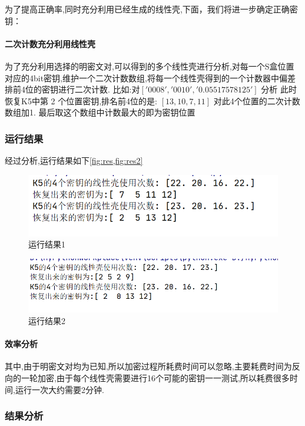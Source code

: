\documentclass[UTF-8]{ctexart}
\begin{document}
为了提高正确率,同时充分利用已经生成的线性壳,下面，我们将进一步确定正确密钥：
 \paragraph{二次计数充分利用线性壳} 为了充分利用选择的明密文对,可以得到的多个线性壳进行分析,对每一个S盒位置对应的4bit密钥,维护一个二次计数数组,将每一个线性壳得到的一个计数器中偏差排前4位的密钥进行二次计数.
	比如:对$['0008','0010','0.05517578125']$ 分析
	此时恢复K5中第 2 个位置密钥,排名前4位的是: $[13,10,7,11]$
	对此4个位置的二次计数数组加1.
	最后取这个数组中计数最大的即为密钥位置
\subsubsection{运行结果}
经过分析,运行结果如下\cref{fig:res,fig:res2}
\begin{figure}[!htbp]
	\centering
	\includegraphics[width=0.8\linewidth]{Res}
	\caption{运行结果1}
	\label{fig:res}
\end{figure}

\begin{figure}[!htbp]
	\centering
	\includegraphics[width=0.8\linewidth]{Res2}
	\caption{运行结果2}
	\label{fig:res2}
\end{figure}
\paragraph{效率分析}
其中,由于明密文对均为已知,所以加密过程所耗费时间可以忽略,主要耗费时间为反向的一轮加密,由于每个线性壳需要进行16个可能的密钥一一测试,所以耗费很多时间,运行一次大约需要2分钟.
\subsubsection{结果分析}
\end{document}
